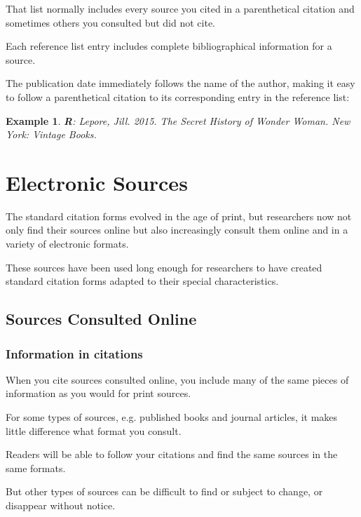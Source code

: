 \documentclass[oneside]{book}
\numberwithin{equation}{section}
\newtheorem{example}{Example}[section]
\begin{document}
That list normally includes every source you cited in a parenthetical citation and sometimes others you consulted but did not cite.

Each reference list entry includes complete bibliographical information for a source.

The publication date immediately follows the name of the author, making it easy to follow a parenthetical citation to its corresponding entry in the reference list:
\begin{example}\rm
    \textbf{R}: Lepore, Jill. 2015. \textit{The Secret History of Wonder Woman}. New York: Vintage Books.
\end{example}

\section{Electronic Sources}
The standard citation forms evolved in the age of print, but researchers now not only find their sources online but also increasingly consult them online and in a variety of electronic formats.

These sources have been used long enough for researchers to have created standard citation forms adapted to their special characteristics.

\subsection{Sources Consulted Online}

\subsubsection{Information in citations}
When you cite sources consulted online, you include many of the same pieces of information as you would for print sources.

For some types of sources, e.g. published books and journal articles, it makes little difference what format you consult.

Readers will be able to follow your citations and find the same sources in the same formats.

But other types of sources can be difficult to find or subject to change, or disappear without notice.
\end{document}
